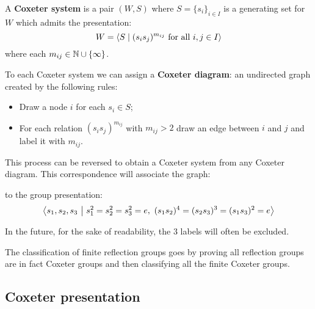\documentclass[../main.tex]{subfiles}
\begin{document}
\begin{definition}
    A \textbf{Coxeter system} is a pair $(W,S)$ where $S=\{s_i\}_{i\in I}$ is a generating set for $W$ which admits the presentation:\[
        W = \left\langle S \mid (s_i s_j)^{m_{ij}} \text{ for all } i,j\in I \right\rangle
    \]
    where each $m_{ij}\in \mathbb{N}\cup\{\infty\}$.
\end{definition}

To each Coxeter system we can assign a \textbf{Coxeter diagram}: an undirected graph created by the following rules:\begin{itemize}
    \item Draw a node $i$ for each $s_i\in S$;
    \item For each relation $(s_i s_j)^{m_{ij}}$ with $m_{ij}>2$ draw an edge between $i$ and $j$ and label it with $m_{ij}$.
\end{itemize}

This process can be reversed to obtain a Coxeter system from any Coxeter diagram. This correspondence will associate the graph:
\begin{figure}[!h]
\centering
{}
\end{figure}

to the group presentation: \[
\left\langle s_1,s_2,s_3 \ \middle| \ s_1^2 = s_2^2 = s_3^2 = e, \ (s_1s_2)^4 = (s_2s_3)^3 = (s_1s_3)^2 = e \right\rangle
\]

In the future, for the sake of readability, the $3$ labels will often be excluded.

The classification of finite reflection groups goes by proving all reflection groups are in fact Coxeter groups and then classifying all the finite Coxeter groups.

\subsection{Coxeter presentation}\label{subsection:coxeter presentation}
\end{document}
